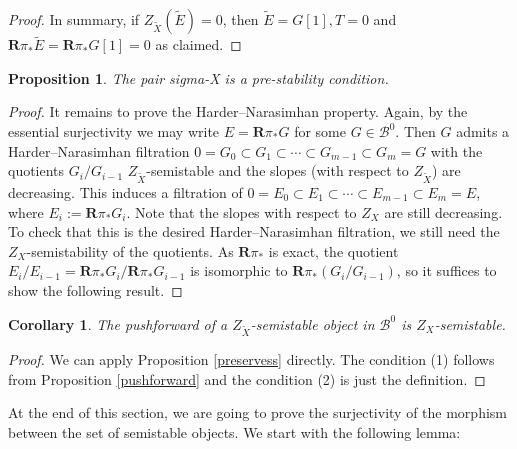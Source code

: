 \documentclass[12pt]{amsart}
\newtheorem{proposition}[theorem]{Proposition}
\newtheorem{corollary}[theorem]{Corollary}
\theoremstyle{definition}
\begin{document}
\begin{proof}
In summary, if $Z_{\widetilde{X}}(\widetilde{E})=0$,
then $\widetilde{E} = G[1],T=0$ and $\mathbf{R}\pi_\ast \widetilde{E} = \mathbf{R}\pi_\ast G[1] =0$ as claimed.
\end{proof}


\begin{proposition}
The pair \gls{sigma-X} is a pre-stability condition.
\end{proposition}
\begin{proof}
It remains to prove the Harder--Narasimhan property.
Again, by the essential surjectivity we may write $E = \mathbf{R}\pi_\ast G$ for some $G \in \mathcal{B}^0$.
Then $G$ admits a Harder--Narasimhan filtration $ 0 = G_0 \subset G_1 \subset \cdots \subset G_{m-1} \subset G_m = G$ with the quotients $G_i/G_{i-1}$ $Z_{\widetilde{X}}$-semistable and the slopes (with respect to $Z_{\widetilde{X}}$) are decreasing.
This induces a filtration of $ 0 = E_0 \subset E_1 \subset \cdots \subset E_{m-1} \subset E_m = E$, where $E_i:=\mathbf{R}\pi_\ast G_i$.
Note that the slopes with respect to $Z_X$ are still decreasing.
To check that this is the desired Harder--Narasimhan filtration, we still need the $Z_X$-semistability of the quotients.
As $\mathbf{R}\pi_\ast$ is exact, the quotient $E_i/E_{i-1}= \mathbf{R}\pi_\ast G_i / \mathbf{R}\pi_\ast G_{i-1}$ is isomorphic to $\mathbf{R}\pi_\ast(G_i/G_{i-1})$,
so it suffices to show the following result.
\end{proof}

\begin{corollary}
The pushforward of a $Z_{\widetilde{X}}$-semistable object in $\mathcal{B}^0$ is $Z_X$-semistable.
\end{corollary}
\begin{proof}
We can apply Proposition \ref{preservess} directly.
The condition (1) follows from Proposition \ref{pushforward} and the condition (2) is just the definition. 
\end{proof}

At the end of this section,
we are going to prove the surjectivity of the morphism between the set of semistable objects.
We start with the following lemma:
\end{document}
